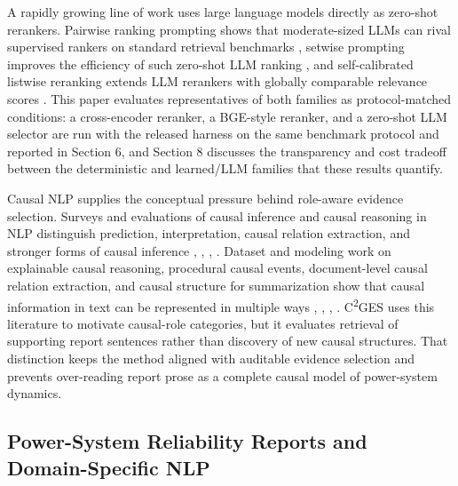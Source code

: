 \documentclass{ieeeaccess}
\begin{document}
A rapidly growing line of work uses large language models directly as zero-shot rerankers. Pairwise ranking prompting shows that moderate-sized LLMs can rival supervised rankers on standard retrieval benchmarks \cite{qin2024pairwise}, setwise prompting improves the efficiency of such zero-shot LLM ranking \cite{zhuang2024setwise}, and self-calibrated listwise reranking extends LLM rerankers with globally comparable relevance scores \cite{ren2025selfcalibrated}. This paper evaluates representatives of both families as protocol-matched conditions: a cross-encoder reranker, a BGE-style reranker, and a zero-shot LLM selector are run with the released harness on the same benchmark protocol and reported in Section 6, and Section 8 discusses the transparency and cost tradeoff between the deterministic and learned/LLM families that these results quantify.

Causal NLP supplies the conceptual pressure behind role-aware evidence selection. Surveys and evaluations of causal inference and causal reasoning in NLP distinguish prediction, interpretation, causal relation extraction, and stronger forms of causal inference \cite{feder2022causal}, \cite{kcman2023causal}, \cite{gao2023chatgpt}, \cite{wang2024causalbench}. Dataset and modeling work on explainable causal reasoning, procedural causal events, document-level causal relation extraction, and causal structure for summarization show that causal information in text can be represented in multiple ways \cite{du2022ecare}, \cite{zhang2023causal}, \cite{wang2024documentlevel}, \cite{chen2023inducing}. C\textsuperscript{2}GES uses this literature to motivate causal-role categories, but it evaluates retrieval of supporting report sentences rather than discovery of new causal structures. That distinction keeps the method aligned with auditable evidence selection and prevents over-reading report prose as a complete causal model of power-system dynamics.

\subsection{Power-System Reliability Reports and Domain-Specific NLP}

\label{sec:power_system_reliability_reports_and_dom}
\end{document}
